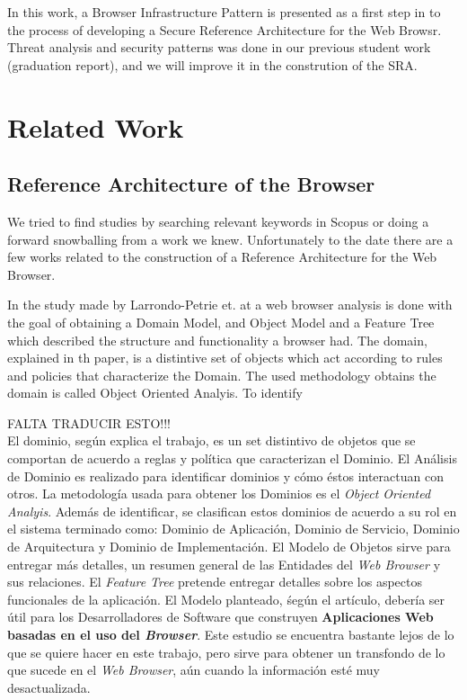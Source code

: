 \documentclass{sig-alternate-05-2015}
\begin{document}
In this work, a Browser Infrastructure Pattern is presented as a first step in to the process of developing a Secure Reference Architecture for the Web Browsr. Threat analysis and security patterns was done in our previous student work (graduation report), and we will improve it in the constrution of the SRA.

\section*{Related Work}
  \subsection*{Reference Architecture of the Browser}
  We tried to find studies by searching relevant keywords in Scopus or doing a forward snowballing from a work \cite{2005-grosskurth-browser-refarch} we knew. Unfortunately to the date there are a few works related to the construction of a Reference Architecture for the Web Browser.

  In the study made by Larrondo-Petrie et. at \cite{535061} a web browser analysis is done with the goal of obtaining a Domain Model, and Object Model and a Feature Tree which described the structure and functionality a browser had. The domain, explained in th paper, is a distintive set of objects which act according to rules and policies that characterize the Domain. The used methodology obtains the domain is called Object Oriented Analyis. To identify

  FALTA TRADUCIR ESTO!!!\\
  El dominio, según explica el trabajo, es un set distintivo de objetos que se comportan de acuerdo a reglas y política que caracterizan el Dominio. El Análisis de Dominio es realizado para identificar dominios y cómo éstos interactuan con otros. La metodología usada para obtener los Dominios es el \textit{Object Oriented Analyis}. Además de identificar, se clasifican estos dominios de acuerdo a su rol en el sistema terminado como: Dominio de Aplicación, Dominio de Servicio, Dominio de Arquitectura y Dominio de Implementación. El Modelo de Objetos sirve para entregar más detalles, un resumen general de las Entidades del \textit{Web Browser} y sus relaciones. El \textit{Feature Tree} pretende entregar detalles sobre los aspectos funcionales de la aplicación. El Modelo planteado, śegún el artículo, debería ser útil para los Desarrolladores de Software que construyen \textbf{Aplicaciones Web basadas en el uso del \textit{Browser}}.  Este estudio se encuentra bastante lejos de lo que se quiere hacer en este trabajo, pero sirve para obtener un transfondo de lo que sucede en el \textit{\textit{Web Browser}}, aún cuando la información esté muy desactualizada.
\end{document}
